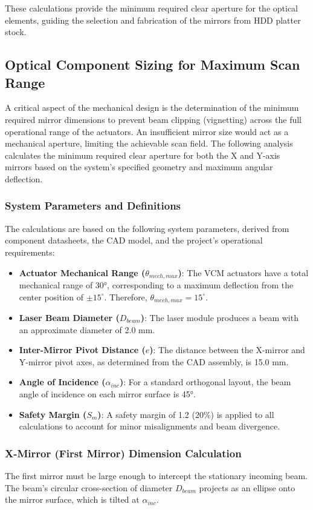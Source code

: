 \documentclass[12pt]{article}
\begin{document}
These calculations provide the minimum required clear aperture for the optical elements, guiding the selection and fabrication of the mirrors from HDD platter stock.

\subsection{Optical Component Sizing for Maximum Scan Range}

A critical aspect of the mechanical design is the determination of the minimum required mirror dimensions to prevent beam clipping (vignetting) across the full operational range of the actuators. An insufficient mirror size would act as a mechanical aperture, limiting the achievable scan field. The following analysis calculates the minimum required clear aperture for both the X and Y-axis mirrors based on the system's specified geometry and maximum angular deflection.

\subsubsection{System Parameters and Definitions}
The calculations are based on the following system parameters, derived from component datasheets, the CAD model, and the project's operational requirements:

\begin{itemize}
\item \textbf{Actuator Mechanical Range (\(\theta_{mech,max}\))}: The VCM actuators have a total mechanical range of 30°, corresponding to a maximum deflection from the center position of \(\pm 15^\circ\). Therefore, \(\theta_{mech,max} = 15^\circ\).
\item \textbf{Laser Beam Diameter (\(D_{beam}\))}: The laser module produces a beam with an approximate diameter of 2.0 mm.
\item \textbf{Inter-Mirror Pivot Distance (\(e\))}: The distance between the X-mirror and Y-mirror pivot axes, as determined from the CAD assembly, is 15.0 mm.
\item \textbf{Angle of Incidence (\(\alpha_{inc}\))}: For a standard orthogonal layout, the beam angle of incidence on each mirror surface is 45°.
\item \textbf{Safety Margin (\(S_m\))}: A safety margin of 1.2 (20\%) is applied to all calculations to account for minor misalignments and beam divergence.
\end{itemize}

\subsubsection{X-Mirror (First Mirror) Dimension Calculation}
The first mirror must be large enough to intercept the stationary incoming beam. The beam's circular cross-section of diameter \(D_{beam}\) projects as an ellipse onto the mirror surface, which is tilted at \(\alpha_{inc}\).
\end{document}
